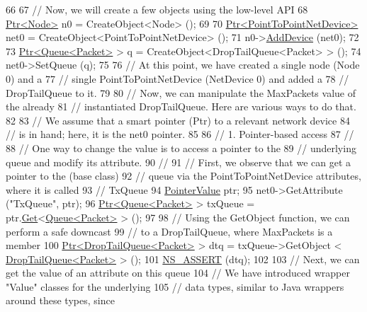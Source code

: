 \begin{DoxyCode}
66 
67   \textcolor{comment}{// Now, we will create a few objects using the low-level API}
68   \hyperlink{classns3_1_1Ptr}{Ptr<Node>} n0 = CreateObject<Node> ();
69 
70   \hyperlink{classns3_1_1Ptr}{Ptr<PointToPointNetDevice>} net0 = CreateObject<PointToPointNetDevice> ();
71   n0->\hyperlink{classns3_1_1Node_a42ff83ee1d5d1649c770d3f5b62375de}{AddDevice} (net0);
72 
73   \hyperlink{classns3_1_1Ptr}{Ptr<Queue<Packet>} > q = CreateObject<DropTailQueue<Packet> > ();
74   net0->SetQueue (q);
75 
76   \textcolor{comment}{// At this point, we have created a single node (Node 0) and a }
77   \textcolor{comment}{// single PointToPointNetDevice (NetDevice 0) and added a }
78   \textcolor{comment}{// DropTailQueue to it.}
79 
80   \textcolor{comment}{// Now, we can manipulate the MaxPackets value of the already }
81   \textcolor{comment}{// instantiated DropTailQueue.  Here are various ways to do that.}
82 
83   \textcolor{comment}{// We assume that a smart pointer (Ptr) to a relevant network device}
84   \textcolor{comment}{// is in hand; here, it is the net0 pointer. }
85 
86   \textcolor{comment}{// 1.  Pointer-based access}
87   \textcolor{comment}{//}
88   \textcolor{comment}{// One way to change the value is to access a pointer to the}
89   \textcolor{comment}{// underlying queue and modify its attribute.}
90   \textcolor{comment}{// }
91   \textcolor{comment}{// First, we observe that we can get a pointer to the (base class)}
92   \textcolor{comment}{// queue via the PointToPointNetDevice attributes, where it is called}
93   \textcolor{comment}{// TxQueue }
94   \hyperlink{classns3_1_1PointerValue}{PointerValue} ptr;
95   net0->GetAttribute (\textcolor{stringliteral}{"TxQueue"}, ptr);
96   \hyperlink{classns3_1_1Ptr}{Ptr<Queue<Packet>} > txQueue = ptr.\hyperlink{classns3_1_1PointerValue_ae8e90fe3c0810cd6e4e1b1ba31f52a66}{Get}<\hyperlink{classns3_1_1Queue}{Queue<Packet>} > ();
97 
98   \textcolor{comment}{// Using the GetObject function, we can perform a safe downcast}
99   \textcolor{comment}{// to a DropTailQueue, where MaxPackets is a member}
100   \hyperlink{classns3_1_1Ptr}{Ptr<DropTailQueue<Packet>} > dtq = txQueue->GetObject <
      \hyperlink{classns3_1_1DropTailQueue}{DropTailQueue<Packet>} > ();
101   \hyperlink{assert_8h_a6dccdb0de9b252f60088ce281c49d052}{NS\_ASSERT} (dtq);
102 
103   \textcolor{comment}{// Next, we can get the value of an attribute on this queue}
104   \textcolor{comment}{// We have introduced wrapper "Value" classes for the underlying}
105   \textcolor{comment}{// data types, similar to Java wrappers around these types, since}

\end{DoxyCode}
